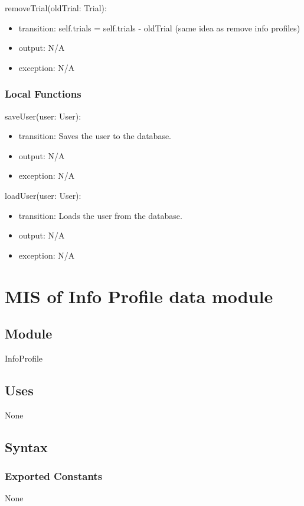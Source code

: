 \documentclass[12pt, titlepage]{article}
\begin{document}
\noindent removeTrial(oldTrial: Trial):
\begin{itemize}
\item transition: self.trials = self.trials - oldTrial (same idea as remove info profiles)
\item output: N/A
\item exception: N/A
\end{itemize}

\subsubsection{Local Functions}
\noindent saveUser(user: User):
\begin{itemize}
\item transition: Saves the user to the database.
\item output: N/A
\item exception: N/A
\end{itemize}

\noindent loadUser(user: User):
\begin{itemize}
\item transition: Loads the user from the database.
\item output: N/A
\item exception: N/A
\end{itemize}


\section{MIS of Info Profile data module} \label{InfoProfile}

\subsection{Module}

InfoProfile

\subsection{Uses}
None

\subsection{Syntax}

\subsubsection{Exported Constants}
None
\end{document}
